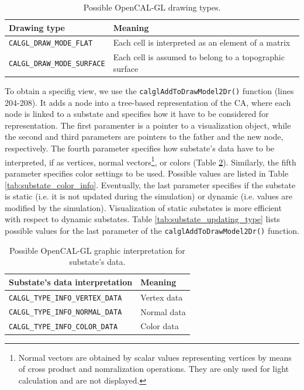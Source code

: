 \begin{table}
  \centering
  \footnotesize
  \begin{tabular}{l|l}
    \hline
    Drawing type & Meaning \\
    \hline
    \hline
    \verb'CALGL_DRAW_MODE_FLAT'    & Each cell is interpreted as an element of a matrix\\
    \verb'CALGL_DRAW_MODE_SURFACE' & Each cell is assumed to belong to a topographic surface\\
    \hline
  \end{tabular}
  \caption{Possible OpenCAL-GL drawing types.}
  \label{tab:draw_modes}
\end{table} 

To obtain a specifig view, we use the \verb'calglAddToDrawModel2Dr()'
function (lines 204-208). It adds a node into a tree-based
representation of the CA, where each node is linked to a substate and
specifies how it have to be considered for representation. The first
paramenter is a pointer to a visualization object, while the second
and third parameters are pointers to the father and the new node,
respectively. The fourth parameter specifies how substate's data have
to be interpreted, if as vertices, normal vectors\footnote{Normal
  vectors are obtained by scalar values representing vertices by means
  of cross product and nomralization operations. They are only used
  for light calculation and are not displayed.}, or colors (Table
\ref{tab:substate_type_info}). Similarly, the fifth parameter
specifies color settings to be used. Possible values are listed in
Table \ref{tab:substate_color_info}. Eventually, the last parameter
specifies if the substate is static (i.e. it is not updated during the
simulation) or dynamic (i.e. values are modified by the
simulation). Visualization of static substates is more efficient with
respect to dynamic substates. Table \ref{tab:substate_updating_type}
lists possible values for the last parameter of the
\verb'calglAddToDrawModel2Dr()' function.

\begin{table}
  \centering
  \small
  \begin{tabular}{l|l}
    \hline
    Substate's data interpretation & Meaning \\
    \hline
    \hline
    \verb'CALGL_TYPE_INFO_VERTEX_DATA' & Vertex data\\
    \verb'CALGL_TYPE_INFO_NORMAL_DATA'  & Normal data\\
    \verb'CALGL_TYPE_INFO_COLOR_DATA' & Color data\\
    \hline
  \end{tabular}
  \caption{Possible OpenCAL-GL graphic interpretation for substate's data.}
  \label{tab:substate_type_info}
\end{table} 


